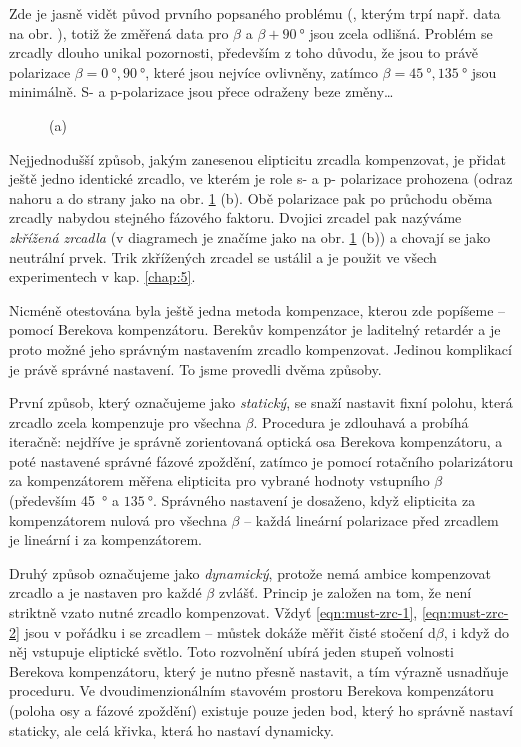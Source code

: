 Zde je jasně vidět původ prvního popsaného problému (, kterým trpí např. data na obr. ), totiž že změřená data pro $\beta$ a $\beta+\SI{90}{\degree}$ jsou zcela odlišná.
Problém se zrcadly dlouho unikal pozornosti, především z toho důvodu, že jsou to právě polarizace $\beta=\SI{0}{\degree}, \SI{90}{\degree}$, které jsou nejvíce ovlivněny, zatímco $\beta=\SI{45}{\degree}, \SI{135}{\degree}$ jsou minimálně.
S- a p-polarizace jsou přece odraženy beze změny\ldots

\begin{figure}[htbp]
    \centering
    \caption{(a) }
    \label{fig:mustek-zrcadlo-data}
\end{figure}

Nejjednodušší způsob, jakým zanesenou elipticitu zrcadla kompenzovat, je přidat ještě jedno identické zrcadlo, ve kterém je role s- a p- polarizace prohozena (odraz nahoru a do strany jako na obr. \ref{fig:mustek-zrcadlo-data} (b).
Obě polarizace pak po průchodu oběma zrcadly nabydou stejného fázového faktoru.
Dvojici zrcadel pak nazýváme \emph{zkřížená zrcadla} (v diagramech je značíme jako na obr. \ref{fig:mustek-zrcadlo-data} (b)) a chovají se jako neutrální prvek.
Trik zkřížených zrcadel se ustálil a je použit ve všech experimentech v kap. \ref{chap:5}.


Nicméně otestována byla ještě jedna metoda kompenzace, kterou zde popíšeme -- pomocí Berekova kompenzátoru.
Berekův kompenzátor je laditelný retardér a je proto možné jeho správným nastavením zrcadlo kompenzovat.
Jedinou komplikací je právě správné nastavení.
To jsme provedli dvěma způsoby.

První způsob, který označujeme jako \emph{statický}, se snaží nastavit fixní polohu, která zrcadlo zcela kompenzuje pro všechna $\beta$.
Procedura je zdlouhavá a probíhá iteračně: nejdříve je správně zorientovaná optická osa Berekova kompenzátoru, a poté nastavené správné fázové zpoždění, zatímco je pomocí rotačního polarizátoru za kompenzátorem měřena elipticita pro vybrané hodnoty vstupního $\beta$ (především \SI{45}{\degree} a $\SI{135}{\degree}$.
Správného nastavení je dosaženo, když elipticita za kompenzátorem nulová pro všechna $\beta$ -- každá lineární polarizace před zrcadlem je lineární i za kompenzátorem.

Druhý způsob označujeme jako \emph{dynamický}, protože nemá ambice kompenzovat zrcadlo a je nastaven pro každé $\beta$ zvlášť.
Princip je založen na tom, že není striktně vzato nutné zrcadlo kompenzovat. Vždyť \eqref{eqn:must-zrc-1}, \eqref{eqn:must-zrc-2} jsou v pořádku i se zrcadlem -- můstek dokáže měřit čisté stočení $\textrm{d}\beta$, i když do něj vstupuje eliptické světlo.
Toto rozvolnění ubírá jeden stupeň volnosti Berekova kompenzátoru, který je nutno přesně nastavit, a tím výrazně usnadňuje proceduru.
Ve dvoudimenzionálním stavovém prostoru Berekova kompenzátoru (poloha osy a fázové zpoždění) existuje pouze jeden bod, který ho správně nastaví staticky, ale celá křivka, která ho nastaví dynamicky.

